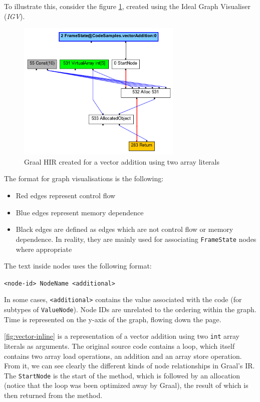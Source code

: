 To illustrate this, consider the figure \ref{fig:vector-inline}, created using the Ideal Graph Visualiser (\textit{IGV}).

\begin{figure}
	\centering
	\includegraphics[width=0.7\textwidth]{graphics/loop-inline.png}
	\caption{Graal HIR created for a vector addition using two array literals}
	\label{fig:vector-inline}
\end{figure}

The format for graph visualisations is the following:
\begin{itemize}
	\item Red edges represent control flow
	\item Blue edges represent memory dependence
	\item Black edges are defined as edges which are not control flow or memory dependence. In reality, they are mainly used for associating \texttt{FrameState} nodes where appropriate
\end{itemize}

The text inside nodes uses the following format:

\texttt{<node-id> NodeName <additional>}

In some cases, \texttt{<additional>} contains the value associated with the code (for subtypes of \texttt{ValueNode}). Node IDs are unrelated to the ordering within the graph. Time is represented on the y-axis of the graph, flowing down the page.

\autoref{fig:vector-inline} is a representation of a vector addition using two \texttt{int} array literals as arguments. The original source code contains a loop, which itself contains two array load operations, an addition and an array store operation. From it, we can see clearly the different kinds of node relationships in Graal's IR. The \texttt{StartNode} is the start of the method, which is followed by an allocation (notice that the loop was been optimized away by Graal), the result of which is then returned from the method.

